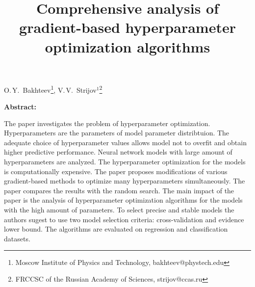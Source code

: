 \documentclass[12pt]{article}
\begin{document}
\title{Comprehensive analysis of gradient-based hyperparameter optimization algorithms}
\date{}
\maketitle

 \begin{center}
 {O.\,Y.~Bakhteev\footnote{Moscow Institute of Physics and Technology, bakhteev@phystech.edu},
 V.\,V.~Strijov$^1$\footnote{FRCCSC of the Russian Academy of Sciences, strijov@ccas.ru}} %
 \end{center}

\textbf{Abstract:} 


The paper investigates the problem of hyperparameter optimization. Hyperparameters are the parameters of model parameter distribtuion. The adequate choice of hyperparameter values allows model not to overfit and obtain higher predictive performance.  Neural network models with large amount of hyperparameters are analyzed. The hyperparameter optimization for the models is computationally expensive. The paper proposes modifications of various gradient-based methods to optimize many hyperparameters simultaneously. The paper compares the results with the random search. The main impact of the paper is the analysis of hyperparameter optimization algorithms for the models with the high amount of parameters. To select precise and stable models the authors sugest to use two model selection criteria: cross-validation and evidence lower bound. The algorithms are evaluated on  regression and classification datasets.
%
\end{document}
